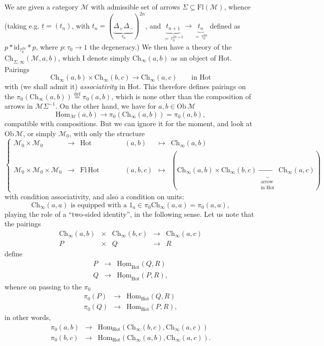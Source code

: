 \documentclass[11pt]{article}
\newcommand{\printedpage}[1]{\marginpar{\footnotesize p.~#1}}
\newcommand{\msp}[1]{\marginpar{\footnotesize [#1]}}
\newcommand{\Ch}{\mathrm{Ch}}
\newcommand{\Hot}{\mathrm{Hot}}
\newcommand{\Hom}{\mathrm{Hom}}
\begin{document}
We are given a category $\mathcal{M}$ with admissible set of arrows $\Sigma \subseteq \mathrm{Fl}(\mathcal{M})$, whence (taking e.g. $\underline{t} = (t_n)$, with $t_n = (\underbrace{\Delta_+\Delta_-}_{\tau_0})^{2n}$, and $\underbrace{t_{n+1}}_{=\,\tau_0^{2n+2}} \longrightarrow \underbrace{t_n}_{=\,\tau_0^{2n}}$ defined as $p * \mathrm{id}_{\tau_0^{2n}} * p$, where $p : \tau_0 \longrightarrow 1$ the degeneracy.) We then have a theory of the $\underline{\Ch}_{\Sigma,\infty}(\mathcal{M},a,b)$, which I denote simply $\Ch_\infty(a,b)$ as an object of Hot. Pairings
\[
\Ch_\infty(a,b) \times \Ch_\infty(b,c) \longrightarrow \Ch_\infty(a,c) \qquad \text{in Hot}
\]
with (we shall admit it) \textit{associativity} in Hot. This therefore defines pairings on the $\pi_0(\Ch_\infty(a,b)) \overset{\text{def}}{=} \pi_0(a,b)$, which is none other than the composition of arrows in $\mathcal{M}\Sigma^{-1}$. On the other hand, we have for $a,b \in \mathrm{Ob}\,\mathcal{M}$
\[
\Hom_{\mathcal{M}}(a,b) \longrightarrow \pi_0(\Ch_\infty(a,b)) = \pi_0(a,b),
\]
compatible with compositions. But we can ignore it for the moment, and look at $\mathrm{Ob}\,\mathcal{M}$, or simply $\mathcal{M}_0$, with only the structure
\[
\left\{
\begin{array}{ccccccc}
\mathcal{M}_0 \times \mathcal{M}_0 & \longrightarrow & \Hot & \qquad & (a,b) & \longmapsto & \Ch_\infty(a,b) \\[1ex]
\mathcal{M}_0 \times \mathcal{M}_0 \times \mathcal{M}_0 & \longrightarrow & \mathrm{Fl}\,\Hot & \qquad & (a,b,c) & \longmapsto & (\Ch_\infty(a,b) \times \Ch_\infty(b,c) \underbrace{\longrightarrow}_{\substack{\text{arrow}\\ \text{in Hot}}} \Ch_\infty(a,c))
\end{array}
\right.
\]
with condition associativity, and also a condition on units:
\[
\Ch_\infty(a,a) \text{ is equipped with a } 1_a \in \pi_0\Ch_\infty(a,a) = \pi_0(a,a),
\]
playing the role of a ``two-sided identity'', in the following sense. Let us note that the pairings
\[
\begin{array}{ccccc}
\Ch_\infty(a,b) & \times & \Ch_\infty(b,c) & \longrightarrow & \Ch_\infty(a,c) \\[1ex]
P & \times & Q & \longrightarrow & R
\end{array}
\]
\msp{page 2}
define
\[
\begin{array}{ccc}
P & \longrightarrow & \underline{\Hom}_{\Hot}(Q,R) \\[1ex]
Q & \longrightarrow & \underline{\Hom}_{\Hot}(P,R),
\end{array}
\]
whence on passing to the $\pi_0$
\[
\begin{array}{ccc}
\pi_0(P) & \longrightarrow & \Hom_{\Hot}(Q,R) \\[1ex]
\pi_0(Q) & \longrightarrow & \Hom_{\Hot}(P,R),
\end{array}
\]
\printedpage{2}
in other words,
\[
\begin{array}{ccc}
\pi_0(a,b) & \longrightarrow & \Hom_{\Hot}(\Ch_\infty(b,c),\Ch_\infty(a,c)) \\[1ex]
\pi_0(b,c) & \longrightarrow & \Hom_{\Hot}(\Ch_\infty(a,b),\Ch_\infty(a,c)).
\end{array}
\]
\end{document}
